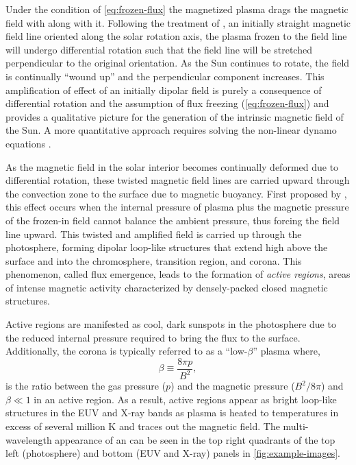 Under the condition of \autoref{eq:frozen-flux} the magnetized plasma drags the magnetic field with along with it. Following the treatment of \citet{golub_solar_2010}, an initially straight magnetic field line oriented along the solar rotation axis, the plasma frozen to the field line will undergo differential rotation such that the field line will be stretched perpendicular to the original orientation. As the Sun continues to rotate, the field is continually ``wound up'' and the perpendicular component increases. This amplification of effect of an initially dipolar field is purely a consequence of differential rotation and the assumption of flux freezing (\autoref{eq:frozen-flux}) and provides a qualitative picture for the generation of the intrinsic magnetic field of the Sun. A more quantitative approach requires solving the non-linear dynamo equations \citep[see Section 4.3.3 of][]{golub_solar_2010}.

As the magnetic field in the solar interior becomes continually deformed due to differential rotation, these twisted magnetic field lines are carried upward through the convection zone to the surface due to magnetic buoyancy. First proposed by \citet{parker_formation_1955}, this effect occurs when the internal pressure of plasma plus the magnetic pressure of the frozen-in field cannot balance the ambient pressure, thus forcing the field line upward. This twisted and amplified field is carried up through the photosphere, forming dipolar loop-like structures that extend high above the surface and into the chromosphere, transition region, and corona. This phenomenon, called flux emergence, leads to the formation of \textit{active regions}, areas of intense magnetic activity characterized by densely-packed closed magnetic structures.

Active regions are manifested as cool, dark sunspots in the photosphere due to the reduced internal pressure required to bring the flux to the surface. Additionally, the corona is typically referred to as a ``low-$\beta$'' plasma where,
\begin{equation}\label{eq:plasma-beta}
    \beta\equiv\frac{8\pi p}{B^2},
\end{equation}
is the ratio between the gas pressure ($p$) and the magnetic pressure ($B^2/8\pi$) and $\beta\ll1$ in an active region. As a result, active regions appear as bright loop-like structures in the EUV and X-ray bands as plasma is heated to temperatures in excess of several million \si{\kelvin} and traces out the magnetic field. The multi-wavelength appearance of an \AR{} can be seen in the top right quadrants of the top left (photosphere) and bottom (EUV and X-ray) panels in \autoref{fig:example-images}.

